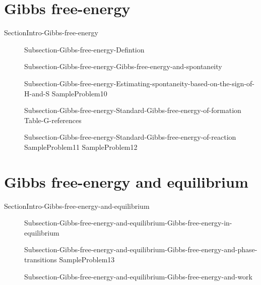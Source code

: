 \documentclass[main.tex]{subfiles}
\begin{document}
\section{Gibbs free-energy}{SectionIntro-Gibbs-free-energy}
\sloppy\begin{description}
\item[] {Subsection-Gibbs-free-energy-Defintion}
\item[] {Subsection-Gibbs-free-energy-Gibbs-free-energy-and-spontaneity}
\item[]{Subsection-Gibbs-free-energy-Estimating-spontaneity-based-on-the-sign-of-H-and-S}
{SampleProblem10}
\item[] {Subsection-Gibbs-free-energy-Standard-Gibbs-free-energy-of-formation}
{Table-G-references}
\item[] {Subsection-Gibbs-free-energy-Standard-Gibbs-free-energy-of-reaction}
{SampleProblem11}
{SampleProblem12}
\end{description}


\section{Gibbs free-energy and equilibrium}{SectionIntro-Gibbs-free-energy-and-equilibrium}
\sloppy\begin{description}
\item[]{Subsection-Gibbs-free-energy-and-equilibrium-Gibbs-free-energy-in-equilibrium}
\item[]{Subsection-Gibbs-free-energy-and-equilibrium-Gibbs-free-energy-and-phase-transitions}
{SampleProblem13}
\newpage \hspace{5cm}{Table-Entropy-phase-change}	

\item[] {Subsection-Gibbs-free-energy-and-equilibrium-Gibbs-free-energy-and-work}
\end{description}
\end{document}
